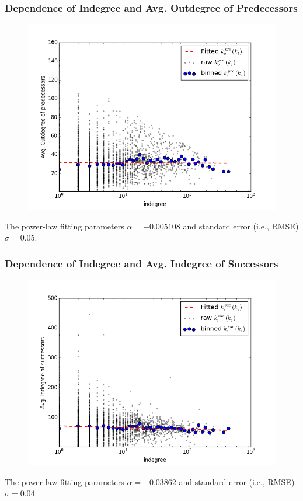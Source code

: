 \documentclass{beamer}
\begin{document}
\begin{frame}
\frametitle{Dependence of Indegree and Avg. Outdegree of Predecessors}
\begin{figure}
\includegraphics[width=0.8\linewidth]{figs/pre_out_in_d.png}
\end{figure}
\small{The power-law fitting parameters $\alpha=-0.005108$ and standard error (i.e., RMSE) $\sigma= 0.05$.}
\end{frame}

\begin{frame}
\frametitle{Dependence of Indegree and Avg. Indegree of Successors}
\begin{figure}
\includegraphics[width=0.8\linewidth]{figs/suc_in_in_d.png}
\end{figure}
\small{The power-law fitting parameters $\alpha=-0.03862$ and standard error (i.e., RMSE) $\sigma= 0.04$.}
\end{frame}
\end{document}
